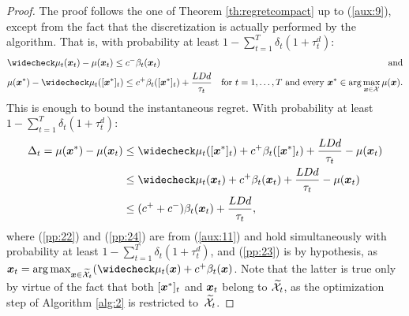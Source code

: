 \regretdiscretized*
\begin{proof}
	The proof follows the one of Theorem \ref{th:regretcompact} up to (\ref{aux:9}), except from the fact that the discretization is actually performed by the algorithm. That is, with probability at least $1-\sum_{t=1}^{T}\delta_t(1+\tau_t^d)$:
	\begin{align}
		&\wc{\mu}_t(\vx_t) - \mu(\vx_t) \leq c^{-}\beta_t(\vx_t) &\text{and}\nonumber\\
		&\mu(\vx^*) - \wc{\mu}_t([\vx^*]_t) \leq c^{+}\beta_t([\vx^*]_t) + \frac{LDd}{\tau_t}
		&\text{for $t=1,\dots,T$ and every $\vx^*\in\arg\max_{\vx\in\Xspace}\mu(\vx)$.}\label{aux:11}
	\end{align}
	This is enough to bound the instantaneous regret. With probability at least $1-\sum_{t=1}^{T}\delta_t(1+\tau_t^d)$:
	\begin{align}
		\Delta_t = \mu(\vx^*) - \mu(\vx_t) 
		&\leq \wc{\mu}_t([\vx^*]_t) + c^{+}\beta_t([\vx^*]_t) + \frac{LDd}{\tau_t} - \mu(\vx_t) \label{pp:23}\\
		&\leq \wc{\mu}_t(\vx_t) + c^{+}\beta_t(\vx_t) + \frac{LDd}{\tau_t} - \mu(\vx_t) \label{pp:24}\\
		&\leq (c^{+}+c^{-})\beta_t(\vx_t) + \frac{LDd}{\tau_t}, \label{aux:12}
	\end{align}
	where (\ref{pp:22}) and (\ref{pp:24}) are from (\ref{aux:11}) and hold simultaneously with probability at least $1-\sum_{t=1}^{T}\delta_t(1+\tau_t^d)$, and (\ref{pp:23}) is by hypothesis, as $\vx_t = \arg\max_{\vx\in\wt{\Xspace}_t}(\wc{\mu}_t(\vx) + c^{+}\beta_t(\vx)$. Note that the latter is true only by virtue of the fact that both $[\boldsymbol{x}^*]_t$ and $\boldsymbol{x}_t$ belong to $\widetilde{\mathcal{X}}_t$, as the optimization step of Algorithm \ref{alg:2} is restricted to~$\widetilde{\mathcal{X}}_t$.
	

\end{proof}
